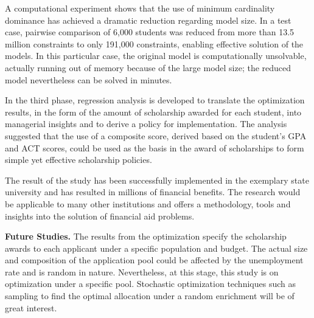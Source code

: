 \documentclass[12pt,english]{report}
\begin{document}
A computational experiment shows that the use of minimum cardinality dominance has achieved a dramatic reduction regarding model size. In a test case, pairwise comparison of 6,000 students was reduced from more than 13.5 million constraints to only 191,000 constraints, enabling effective solution of the models.  In this particular case,  the original model is computationally unsolvable, actually running out of memory because of the large model size;  the reduced model nevertheless can be solved in minutes.

In the third phase, regression analysis is developed to translate the optimization results, in the form of the  amount of scholarship awarded for each student, into managerial insights and to derive a policy for implementation.  The analysis suggested that the use of a composite score, derived based on the student's GPA and ACT scores, could be used as the basis in the award of scholarships to form simple yet effective scholarship policies.

The result of the study has been successfully implemented in the exemplary state university and has resulted in millions of financial benefits.  The research would be applicable to many other institutions and offers a methodology, tools and insights into the solution of financial aid problems. 

\noindent \textbf{Future Studies.}
The results from the optimization specify the scholarship awards to each applicant under a specific population and budget.  The actual size and composition of the application pool could be affected by the unemployment rate and is random in nature.  Nevertheless, at this stage, this study is on optimization under a specific pool.  Stochastic optimization techniques such as sampling  to find the optimal allocation under a random enrichment will be of great interest. 

\end{document}
